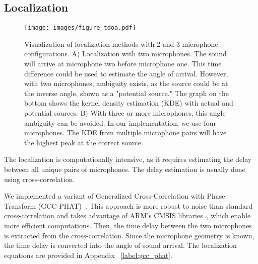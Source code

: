 \subsection{Localization} 
\begin{figure*}
  \centering
  \texttt{[image: images/figure\_tdoa.pdf]}
  \caption{Visualization of localization methods with 2 and 3 microphone configurations. A) Localization with two microphones. The sound will arrive at microphone two before microphone one. This time difference could be used to estimate the angle of arrival. However, with two microphones, ambiguity exists, as the source could be at the inverse angle, shown as a "potential source." The graph on the bottom shows the kernel density estimation (KDE) with actual and potential sources. B) With three or more microphones, this angle ambiguity can be avoided. In our implementation, we use four microphones. The KDE from multiple microphone pairs will have the highest peak at the correct source.  }
  \label{fig:tdoa_diagram}  
\end{figure*}

The localization is computationally intensive, as it requires estimating the delay between all unique pairs of microphones. The delay estimation is usually done using cross-correlation. 

We implemented a variant of Generalized Cross-Correlation with Phase Transform (GCC-PHAT)~\cite{knapp1976generalized}. This approach is more robust to noise than standard cross-correlation and takes advantage of ARM's CMSIS libraries~\cite{cmsis_dsp}, which enable more efficient computations. Then, the time delay between the two microphones is extracted from the cross-correlation. Since the microphone geometry is known, the time delay is converted into the angle of sound arrival. The localization equations are provided in Appendix ~\ref{label:gcc_phat}.   


